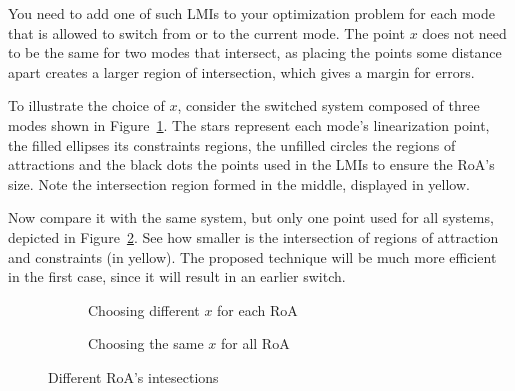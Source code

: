 You need to add one of such LMIs to your optimization problem for each mode that
is allowed to switch from or to the current mode. The point \(x\) does not need
to be the same for two modes that intersect, as placing the points some distance
apart creates a larger region of intersection, which gives a margin for errors.

To illustrate the choice of \(x\), consider the switched system composed of
three modes shown in Figure~\ref{fig:choice-x-roa-diff}. The stars represent
each mode's linearization point, the filled ellipses its constraints regions,
the unfilled circles the regions of attractions and the black dots the points
used in the LMIs to ensure the RoA's size. Note the intersection region formed
in the middle, displayed in yellow.

Now compare it with the same system, but only one point used for all systems,
depicted in Figure~\ref{fig:choice-x-roa-same}. See how smaller is the
intersection of regions of attraction and constraints (in yellow). The proposed
technique will be much more efficient in the first case, since it will result in
an earlier switch.

\begin{figure}[!htb]
	\centering
	\begin{subfigure}[b]{.45\linewidth}
		\centering
		
		\caption{Choosing different \(x\) for each RoA}%
		\label{fig:choice-x-roa-diff}
	\end{subfigure}
	\begin{subfigure}[b]{.45\linewidth}
		\centering
		
		\caption{Choosing the same \(x\) for all RoA}%
		\label{fig:choice-x-roa-same}
	\end{subfigure}
	\caption{Different RoA's intesections}%
	\label{fig:choices-of-x}
\end{figure}
